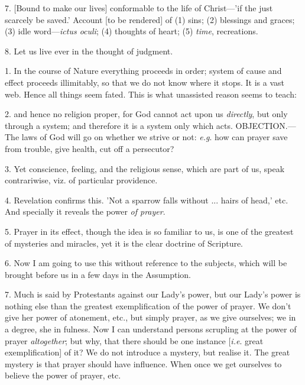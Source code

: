 7. [Bound to make our lives] conformable to the
life of Christ—'if the just scarcely be saved.' Account [to be
rendered] of (1) sins; (2) blessings and graces; (3) idle word—\emph{ictus
oculi}; (4) thoughts of heart; (5) \emph{time}, recreations.

8. Let us live ever in the thought of judgment.


1. In the course of Nature everything proceeds in
order; system of cause and effect proceeds illimitably, so that we do
not know where it stops. It is a vast web. Hence all things seem
fated. This is what unassisted reason seems to teach:

2. and hence no religion proper, for God cannot
act upon us \emph{directly}, but only through a system; and therefore
it is a system only which acts. OBJECTION.—The
laws of God will go on whether we strive or not: \emph{e.g}. how can
prayer save from trouble, give health, cut off a persecutor?

3. Yet conscience, feeling, and the religious
sense, which are part of us, speak contrariwise, viz. of particular
providence.

4. Revelation confirms this. 'Not a sparrow falls
without ... hairs of head,' etc. And specially it reveals the power \emph{of
prayer}.

5. Prayer in its effect, though the idea is so
familiar to us, is one of the greatest of mysteries and miracles, yet
it is the clear doctrine of Scripture.

6. Now I am going to use this without reference
to the subjects, which will be brought before us in a few days in the
Assumption.

7. Much is said by Protestants against our Lady's
power, but our Lady's power is nothing else than the greatest
exemplification of the power of prayer. We don't give her power of
atonement, etc., but simply prayer, as we give ourselves; we in a
degree, she in fulness. Now I can understand persons scrupling at
the power of prayer \emph{altogether}; but why, that there should be
one instance [\emph{i.e}. great exemplification] of it? We do not
introduce a mystery, but realise it. The great mystery is that prayer
should have influence. When once we get ourselves to believe the power
of prayer, etc.

